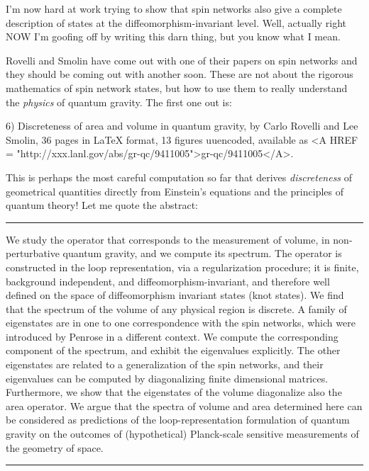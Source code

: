I'm now hard at work trying to show that spin networks also give a
complete description of states at the diffeomorphism-invariant level.
Well, actually right NOW I'm goofing off by writing this darn thing, but
you know what I mean.

Rovelli and Smolin have come out with one of their papers on spin
networks and they should be coming out with another soon.  These are not
about the rigorous mathematics of spin network states, but how to use
them to really understand the \emph{physics} of quantum gravity.  The first
one out is:

6) Discreteness of area and volume in quantum gravity, by Carlo Rovelli
and Lee Smolin, 36 pages in LaTeX format, 13 figures uuencoded,
available as <A HREF = "http://xxx.lanl.gov/abs/gr-qc/9411005">gr-qc/9411005</A>.

This is perhaps the most careful computation so far that derives
\emph{discreteness} of geometrical quantities directly from Einstein's
equations and the principles of quantum theory!  Let me quote the
abstract:

\par\noindent\rule{\textwidth}{0.4pt}
We study the operator that corresponds to the measurement of
volume, in non-perturbative quantum gravity, and we compute its
spectrum.  The operator is constructed in the loop representation, via
a regularization procedure; it is finite, background independent, and
diffeomorphism-invariant, and therefore well defined on the space of
diffeomorphism invariant states (knot states).  We find that the
spectrum of the volume of any physical region is discrete.  A family
of eigenstates are in one to one correspondence with the spin
networks, which were introduced by Penrose in a different context.
We compute the corresponding component of the spectrum, and
exhibit the eigenvalues explicitly.   The other eigenstates are related
to a generalization of the spin networks, and their eigenvalues can be
computed by diagonalizing finite dimensional matrices.  Furthermore,
we show that the eigenstates of the volume diagonalize also the area
operator.  We argue that the spectra of volume and area determined
here can be considered as predictions of the loop-representation
formulation of quantum gravity on the outcomes of (hypothetical)
Planck-scale sensitive measurements of the geometry of space.
\par\noindent\rule{\textwidth}{0.4pt}


